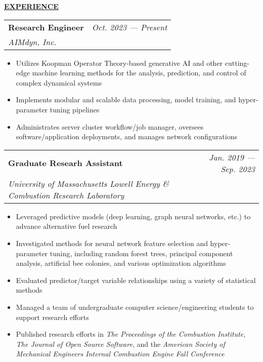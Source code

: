 \documentclass{letter}
\begin{document}
    \medskip \large \textbf{\underline{EXPERIENCE}} \medskip \normalsize

    \setlength\tabcolsep{0cm}
    \begin{tabular*}{\linewidth}{L r}
        \textbf{Research Engineer} & \textit{Oct. 2023 --- Present} \\
        \textit{AIMdyn, Inc.} & 
    \end{tabular*}

    \small
    \begin{itemize}[leftmargin=0.75cm]
        \setlength{\itemsep}{0pt}
        \item Utilizes Koopman Operator Theory-based generative AI and other cutting-edge machine learning methods for the analysis, prediction, and control of complex dynamical systems
        \item Implements modular and scalable data processing, model training, and hyper-parameter tuning pipelines
        \item Administrates server cluster workflow/job manager, oversees software/application deployments, and manages network configurations
    \end{itemize}
    \normalsize

    \begin{tabular*}{\linewidth}{L r}
        \textbf{Graduate Researh Assistant} & \textit{Jan. 2019 --- Sep. 2023} \\
        \textit{University of Massachusetts Lowell Energy \& Combustion Research Laboratory} & 
    \end{tabular*}

    \small
    \begin{itemize}[leftmargin=0.75cm]
        \setlength{\itemsep}{0pt}
        \item Leveraged predictive models (deep learning, graph neural networks, etc.) to advance alternative fuel research
        \item Investigated methods for neural network feature selection and hyper-parameter tuning, including random forest trees, principal component analysis, artificial bee colonies, and various optimization algorithms
        \item Evaluated predictor/target variable relationships using a variety of statistical methods
        \item Managed a team of undergraduate computer science/engineering students to support research efforts
        \item Published research efforts in \textit{The Proceedings of the Combustion Institute}, \textit{The Journal of Open Source Software}, and the \textit{American Society of Mechanical Engineers Internal Combustion Engine Fall Conference}
    \end{itemize}
    \normalsize
\end{document}
